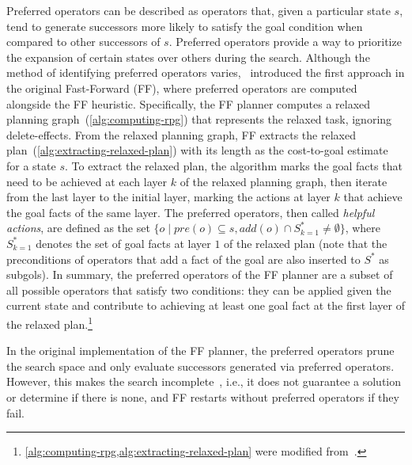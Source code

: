\documentclass[ppgc,diss,english]{iiufrgs}
\begin{document}
Preferred operators can be described as operators that, given a particular state $s$, tend to generate successors more likely to satisfy the goal condition when compared to other successors of $s$. Preferred operators provide a way to prioritize the expansion of certain states over others during the search. Although the method of identifying preferred operators varies,~\citet{Hoffmann.Nebel/2001} introduced the first approach in the original Fast-Forward (FF), where preferred operators are computed alongside the FF heuristic.
Specifically, the FF planner computes a relaxed planning graph~(\cref{alg:computing-rpg}) that represents the relaxed task, ignoring delete-effects. From the relaxed planning graph, FF extracts the relaxed plan~(\cref{alg:extracting-relaxed-plan}) with its length as the cost-to-goal estimate for a state $s$. To extract the relaxed plan, the algorithm marks the goal facts that need to be achieved at each layer $k$ of the relaxed planning graph, then iterate from the last layer to the initial layer, marking the actions at layer $k$ that achieve the goal facts of the same layer. The preferred operators, then called \emph{helpful actions}, are defined as the set $\{o \mid pre(o) \subseteq s, add(o) \cap S_{k=1}^{*} \neq \emptyset \}$, where $S_{k=1}^{*}$ denotes the set of goal facts at layer $1$ of the relaxed plan (note that the preconditions of operators that add a fact of the goal are also inserted to  $S^{*}$ as subgols). In summary, the preferred operators of the FF planner are a subset of all possible operators that satisfy two conditions: they can be applied given the current state and contribute to achieving at least one goal fact at the first layer of the relaxed plan.\footnote{\cref{alg:computing-rpg,alg:extracting-relaxed-plan} were modified from~\citet{Wickler.etal/2015}.}

In the original implementation of the FF planner, the preferred operators prune the search space and only evaluate successors generated via preferred operators. However, this makes the search incomplete~\cite{Richter.Helmert/2009}, i.e., it does not guarantee a solution or determine if there is none, and FF restarts without preferred operators if they fail.
\end{document}
